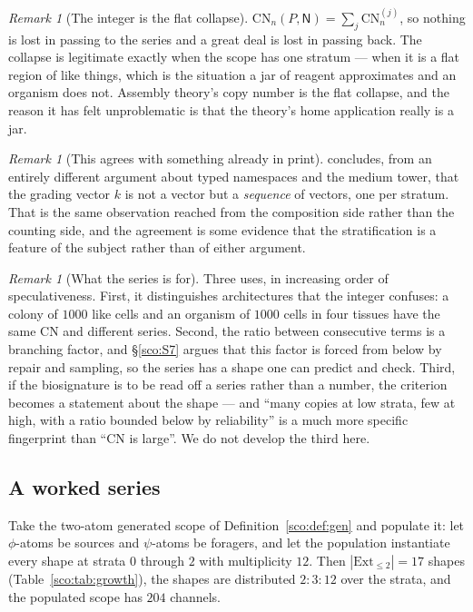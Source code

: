 \documentclass[11pt]{article}
\theoremstyle{plain}
\theoremstyle{definition}
\theoremstyle{remark}
\newtheorem{remark}[theorem]{Remark}
\newcommand{\Nsp}{\mathsf{N}}
\newcommand{\CN}{\mathrm{CN}}
\newcommand{\Ext}{\mathrm{Ext}}
\begin{document}
\begin{remark}[The integer is the flat collapse]\label{sco:rem:collapse}
$\CN_n(P,\Nsp) = \sum_j \CN_n^{(j)}$, so nothing is lost in passing to the
series and a great deal is lost in passing back. The collapse is
legitimate exactly when the scope has one stratum --- when it is a flat
region of like things, which is the situation a jar of reagent
approximates and an organism does not. Assembly theory's copy number is
the flat collapse, and the reason it has felt unproblematic is that the
theory's home application really is a jar.
\end{remark}

\begin{remark}[This agrees with something already in print]
\label{sco:rem:kseq}
\cite[\S8]{engine} concludes, from an entirely different argument about
typed namespaces and the medium tower, that the grading vector $k$ is not
a vector but a \emph{sequence} of vectors, one per stratum. That is the
same observation reached from the composition side rather than the
counting side, and the agreement is some evidence that the stratification
is a feature of the subject rather than of either argument.
\end{remark}

\begin{remark}[What the series is for]\label{sco:rem:seriesfor}
Three uses, in increasing order of speculativeness. First, it distinguishes
architectures that the integer confuses: a colony of $1000$ like cells and
an organism of $1000$ cells in four tissues have the same $\CN$ and
different series. Second, the ratio between consecutive terms is a
branching factor, and \S\ref{sco:S7} argues that this factor is forced from
below by repair and sampling, so the series has a shape one can predict and
check. Third, if the biosignature is to be read off a series rather than a
number, the criterion becomes a statement about the shape --- and ``many
copies at low strata, few at high, with a ratio bounded below by
reliability'' is a much more specific fingerprint than ``$\CN$ is large''.
We do not develop the third here.
\end{remark}

\subsection{A worked series}\label{sco:S4.4}

Take the two-atom generated scope of Definition~\ref{sco:def:gen} and
populate it: let $\phi$-atoms be sources and $\psi$-atoms be foragers, and
let the population instantiate every shape at strata $0$ through $2$ with
multiplicity $12$. Then $|\Ext_{\le 2}| = 17$ shapes
(Table~\ref{sco:tab:growth}), the shapes are distributed $2 : 3 : 12$ over
the strata, and the populated scope has $204$ channels.
\end{document}
